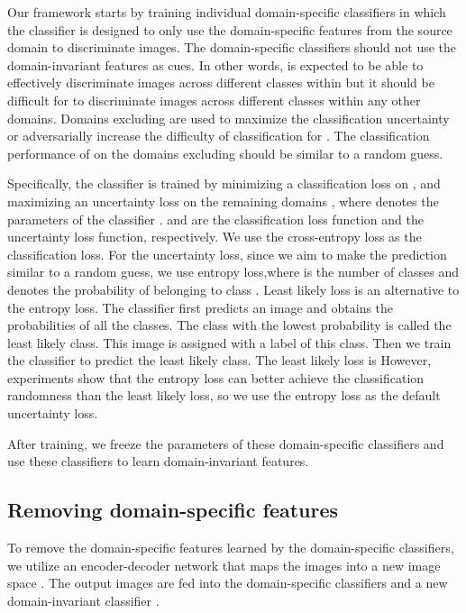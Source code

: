\documentclass{article}
\begin{document}
Our framework starts by training  individual domain-specific classifiers  in which the classifier  is designed to only use the domain-specific features from the source domain  to discriminate images. The domain-specific classifiers  should not use the domain-invariant features as cues. In other words,  is expected to be able to effectively discriminate images across different classes within  but it should be difficult for  to discriminate images across different classes within any other domains. Domains excluding  are used to maximize the classification uncertainty or adversarially increase the difficulty of classification for . The classification performance of  on the domains excluding  should be similar to a random guess.

Specifically, the classifier  is trained by minimizing a classification loss  on , and maximizing an uncertainty loss  on the remaining domains , where  denotes the parameters of the classifier .  and  are the classification loss function and the uncertainty loss function, respectively. We use the cross-entropy loss as the classification loss. For the uncertainty loss, since we aim to make the prediction similar to a random guess, we use entropy loss,where  is the number of classes and  denotes the probability of  belonging to class .
Least likely loss \cite{minderer2020automatic} is an alternative to the entropy loss. The classifier first predicts an image and obtains the probabilities of all the classes. The class with the lowest probability is called the least likely class. This image is assigned with a label of this class. Then we train the classifier to predict the least likely class. The least likely loss is However, experiments show that the entropy loss can better achieve the classification randomness than the least likely loss, so we use the entropy loss as the default uncertainty loss.

After training, we freeze the parameters  of these domain-specific classifiers  and use these classifiers to learn domain-invariant features.

\subsection{Removing domain-specific features}

To remove the domain-specific features learned by the domain-specific classifiers, we utilize an encoder-decoder network  that maps the images into a new image space . The output images are fed into the domain-specific classifiers  and a new domain-invariant classifier . 
\end{document}
